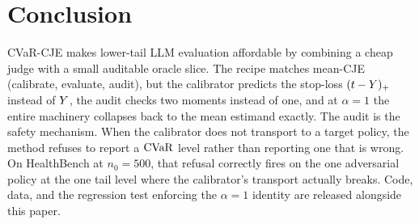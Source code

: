 \section{Conclusion}
\label{sec:conclusion}

CVaR-CJE makes lower-tail LLM evaluation affordable by combining a cheap
judge with a small auditable oracle slice. The recipe matches mean-CJE
(calibrate, evaluate, audit), but the calibrator predicts the stop-loss
$(t-Y)_+$ instead of $Y$, the audit checks two moments instead of one,
and at $\alpha = 1$ the entire machinery collapses back to the mean
estimand exactly. The audit is the safety mechanism. When the calibrator
does not transport to a target policy, the method refuses to report a
$\mathrm{CVaR}$ level rather than reporting one that is wrong. On HealthBench at
$n_0 = 500$, that refusal correctly fires on the one adversarial policy
at the one tail level where the calibrator's transport actually breaks.
Code, data, and the regression test enforcing the $\alpha = 1$ identity
are released alongside this paper.

